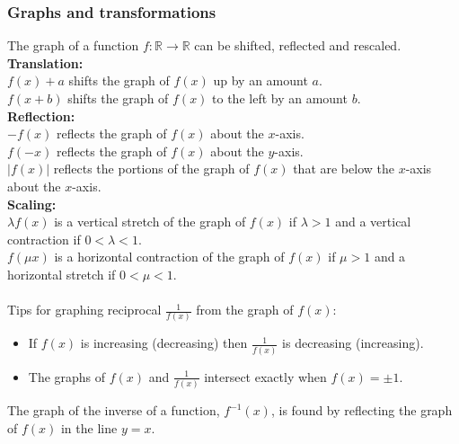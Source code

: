\documentclass[10pt, a4paper]{article}
\newcommand{\R}{\mathbb{R}}
\begin{document}
\subsubsection{Graphs and transformations}
The graph of a function $f : \R \rightarrow \R$ can be shifted, reflected and rescaled. \\
\textbf{Translation:} \\
$f(x) + a$ shifts the graph of $f(x)$ up by an amount $a$. \\
$f(x + b)$ shifts the graph of $f(x)$ to the left by an amount $b$. \\
\textbf{Reflection:} \\
$-f(x)$ reflects the graph of $f(x)$ about the $x$-axis. \\
$f(-x)$ reflects the graph of $f(x)$ about the $y$-axis. \\
$|f(x)|$ reflects the portions of the graph of $f(x)$ that are below the $x$-axis about the $x$-axis. \\
\textbf{Scaling:} \\
$\lambda f(x)$ is a vertical stretch of the graph of $f(x)$ if $\lambda > 1$ and a vertical contraction if $0 < \lambda < 1$. \\
$f(\mu x)$ is a horizontal contraction of the graph of $f(x)$ if $\mu > 1$ and a horizontal stretch if $0 < \mu < 1$. \\
\\
Tips for graphing reciprocal $\frac{1}{f(x)}$ from the graph of $f(x)$:
\begin{itemize}
    \item If $f(x)$ is increasing (decreasing) then $\frac{1}{f(x)}$ is decreasing (increasing).
    \item The graphs of $f(x)$ and $\frac{1}{f(x)}$ intersect exactly when $f(x) = \pm 1$.
\end{itemize}
The graph of the inverse of a function, $f ^ {-1} (x)$, is found by reflecting the graph of $f(x)$ in the line $y = x$.
\end{document}

